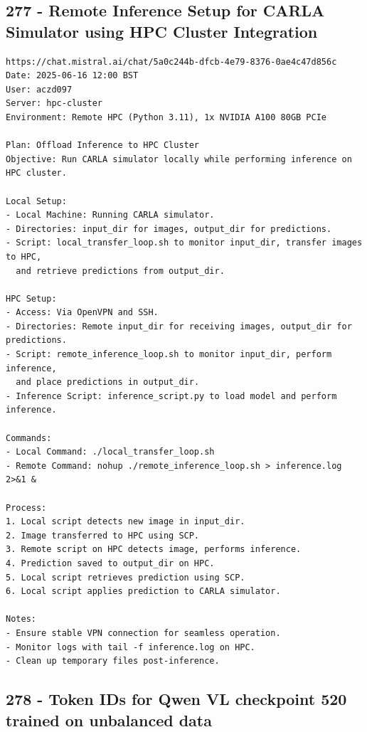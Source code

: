 \subsection{277 - Remote Inference Setup for CARLA Simulator using HPC Cluster Integration}
\label{app_res:277}

\begin{verbatim}
https://chat.mistral.ai/chat/5a0c244b-dfcb-4e79-8376-0ae4c47d856c
Date: 2025-06-16 12:00 BST
User: aczd097
Server: hpc-cluster
Environment: Remote HPC (Python 3.11), 1x NVIDIA A100 80GB PCIe

Plan: Offload Inference to HPC Cluster
Objective: Run CARLA simulator locally while performing inference on HPC cluster.

Local Setup:
- Local Machine: Running CARLA simulator.
- Directories: input_dir for images, output_dir for predictions.
- Script: local_transfer_loop.sh to monitor input_dir, transfer images to HPC,
  and retrieve predictions from output_dir.

HPC Setup:
- Access: Via OpenVPN and SSH.
- Directories: Remote input_dir for receiving images, output_dir for predictions.
- Script: remote_inference_loop.sh to monitor input_dir, perform inference,
  and place predictions in output_dir.
- Inference Script: inference_script.py to load model and perform inference.

Commands:
- Local Command: ./local_transfer_loop.sh
- Remote Command: nohup ./remote_inference_loop.sh > inference.log 2>&1 &

Process:
1. Local script detects new image in input_dir.
2. Image transferred to HPC using SCP.
3. Remote script on HPC detects image, performs inference.
4. Prediction saved to output_dir on HPC.
5. Local script retrieves prediction using SCP.
6. Local script applies prediction to CARLA simulator.

Notes:
- Ensure stable VPN connection for seamless operation.
- Monitor logs with tail -f inference.log on HPC.
- Clean up temporary files post-inference.

\end{verbatim}

\subsection{278 - Token IDs for Qwen VL checkpoint 520 trained on unbalanced data}
\label{app_res:278}

